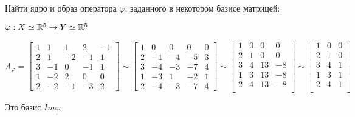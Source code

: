 \begin{example}
    Найти ядро и образ оператора $\varphi$, заданного в некотором базисе матрицей:

    $\varphi : X\simeq \mathbb{R}^5 \to Y\simeq \mathbb{R}^5$

    $$A_\varphi = \begin{bmatrix}
            1 & 1  & 1  & 2  & -1 \\
            2 & 1  & -2 & -1 & 1  \\
            3 & -1 & 0  & -1 & 1  \\
            1 & -2 & 2  & 0  & 0  \\
            2 & -2 & -1 & -3 & 2
        \end{bmatrix} \sim \begin{bmatrix}
            1 & 0  & 0  & 0  & 0 \\
            2 & -1 & -4 & -5 & 3 \\
            3 & -4 & -3 & -7 & 4 \\
            1 & -3 & 1  & -2 & 1 \\
            2 & -4 & -3 & -7 & 4
        \end{bmatrix} \sim \begin{bmatrix}
            1 & 0 & 0  & 0  \\
            2 & 1 & 0  & 0  \\
            3 & 4 & 13 & -8 \\
            1 & 3 & 13 & -8 \\
            2 & 4 & 13 & -8 \\
        \end{bmatrix}\sim\begin{bmatrix}
            1 & 0 & 0 \\
            2 & 1 & 0 \\
            3 & 4 & 1 \\
            1 & 3 & 1 \\
            2 & 4 & 1 \\
        \end{bmatrix}$$

    Это базис $Im \varphi$
\end{example}

